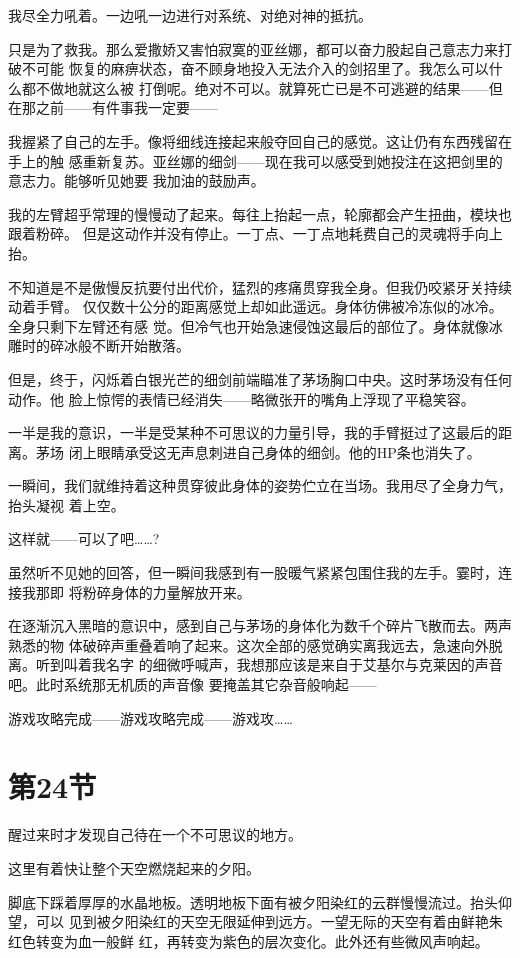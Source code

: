 \documentclass[11pt]{book}
\begin{document}
我尽全力吼着。一边吼一边进行对系统、对绝对神的抵抗。

只是为了救我。那么爱撒娇又害怕寂寞的亚丝娜，都可以奋力股起自己意志力来打破不可能
恢复的麻痹状态，奋不顾身地投入无法介入的剑招里了。我怎么可以什么都不做地就这么被
打倒呢。绝对不可以。就算死亡已是不可逃避的结果——但在那之前——有件事我一定要——

我握紧了自己的左手。像将细线连接起来般夺回自己的感觉。这让仍有东西残留在手上的触
感重新复苏。亚丝娜的细剑——现在我可以感受到她投注在这把剑里的意志力。能够听见她要
我加油的鼓励声。

我的左臂超乎常理的慢慢动了起来。每往上抬起一点，轮廓都会产生扭曲，模块也跟着粉碎。
但是这动作并没有停止。一丁点、一丁点地耗费自己的灵魂将手向上抬。

不知道是不是傲慢反抗要付出代价，猛烈的疼痛贯穿我全身。但我仍咬紧牙关持续动着手臂。
仅仅数十公分的距离感觉上却如此遥远。身体彷佛被冷冻似的冰冷。全身只剩下左臂还有感
觉。但冷气也开始急速侵蚀这最后的部位了。身体就像冰雕时的碎冰般不断开始散落。

但是，终于，闪烁着白银光芒的细剑前端瞄准了茅场胸口中央。这时茅场没有任何动作。他
脸上惊愕的表情已经消失——略微张开的嘴角上浮现了平稳笑容。

一半是我的意识，一半是受某种不可思议的力量引导，我的手臂挺过了这最后的距离。茅场
闭上眼睛承受这无声息刺进自己身体的细剑。他的HP条也消失了。

一瞬间，我们就维持着这种贯穿彼此身体的姿势伫立在当场。我用尽了全身力气，抬头凝视
着上空。

这样就——可以了吧……?

虽然听不见她的回答，但一瞬间我感到有一股暖气紧紧包围住我的左手。霎时，连接我那即
将粉碎身体的力量解放开来。

在逐渐沉入黑暗的意识中，感到自己与茅场的身体化为数千个碎片飞散而去。两声熟悉的物
体破碎声重叠着响了起来。这次全部的感觉确实离我远去，急速向外脱离。听到叫着我名字
的细微呼喊声，我想那应该是来自于艾基尔与克莱因的声音吧。此时系统那无机质的声音像
要掩盖其它杂音般响起——

游戏攻略完成——游戏攻略完成——游戏攻……
\section{第24节}
\label{sec:org6d8c5aa}
醒过来时才发现自己待在一个不可思议的地方。

这里有着快让整个天空燃烧起来的夕阳。

脚底下踩着厚厚的水晶地板。透明地板下面有被夕阳染红的云群慢慢流过。抬头仰望，可以
见到被夕阳染红的天空无限延伸到远方。一望无际的天空有着由鲜艳朱红色转变为血一般鲜
红，再转变为紫色的层次变化。此外还有些微风声响起。
\end{document}
